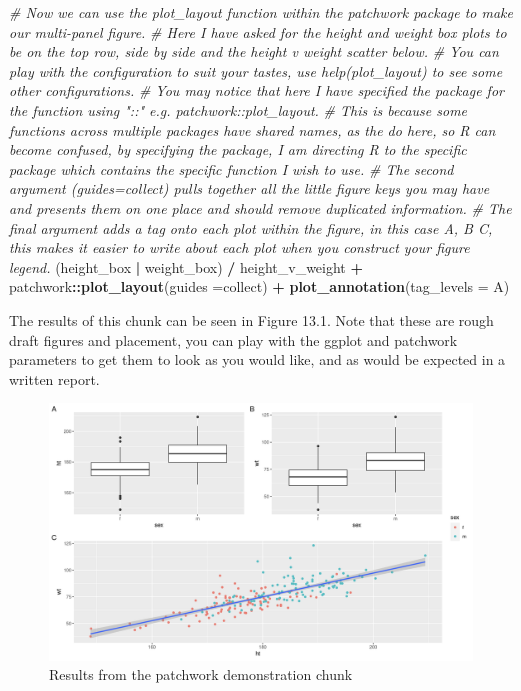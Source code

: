 \documentclass[
]{book}
\newenvironment{Shaded}{\begin{snugshade}}{\end{snugshade}}
\newcommand{\AttributeTok}[1]{\textcolor[rgb]{0.13,0.29,0.53}{#1}}
\newcommand{\CommentTok}[1]{\textcolor[rgb]{0.56,0.35,0.01}{\textit{#1}}}
\newcommand{\FunctionTok}[1]{\textcolor[rgb]{0.13,0.29,0.53}{\textbf{#1}}}
\newcommand{\NormalTok}[1]{#1}
\newcommand{\SpecialCharTok}[1]{\textcolor[rgb]{0.81,0.36,0.00}{\textbf{#1}}}
\newcommand{\StringTok}[1]{\textcolor[rgb]{0.31,0.60,0.02}{#1}}
\begin{document}
\begin{Shaded}
\begin{Highlighting}[]
\CommentTok{\# Now we can use the plot\_layout function within the patchwork package to make our multi{-}panel figure.}
\CommentTok{\# Here I have asked for the height and weight box plots to be on the top row, side by side and the height v weight scatter below.}
\CommentTok{\# You can play with the configuration to suit your tastes, use help(plot\_layout) to see some other configurations.}
\CommentTok{\# You may notice that here I have specified the package for the function using "::" e.g. patchwork::plot\_layout.}
\CommentTok{\# This is because some functions across multiple packages have shared names, as the do here, so R can become confused, by specifying the package, I am directing R to the specific package which contains the specific function I wish to use. }
\CommentTok{\# The second argument (guides=\textquotesingle{}collect\textquotesingle{}) pulls together all the little figure keys you may have and presents them on one place and should remove duplicated information.}
\CommentTok{\# The final argument adds a tag onto each plot within the figure, in this case A, B C, this makes it easier to write about each plot when you construct your figure legend.}
\NormalTok{(height\_box }\SpecialCharTok{|}\NormalTok{ weight\_box) }\SpecialCharTok{/}\NormalTok{ height\_v\_weight }\SpecialCharTok{+} 
\NormalTok{  patchwork}\SpecialCharTok{::}\FunctionTok{plot\_layout}\NormalTok{(}\AttributeTok{guides =}\StringTok{\textquotesingle{}collect\textquotesingle{}}\NormalTok{) }\SpecialCharTok{+}
  \FunctionTok{plot\_annotation}\NormalTok{(}\AttributeTok{tag\_levels =} \StringTok{\textquotesingle{}A\textquotesingle{}}\NormalTok{)}
\end{Highlighting}
\end{Shaded}

The results of this chunk can be seen in Figure 13.1. Note that these are rough draft figures and placement, you can play with the ggplot and patchwork parameters to get them to look as you would like, and as would be expected in a written report.

\begin{figure}
\includegraphics[width=0.9\linewidth]{figures/multipanel} \caption{Results from the patchwork demonstration chunk}\label{fig:unnamed-chunk-79}
\end{figure}
\end{document}
